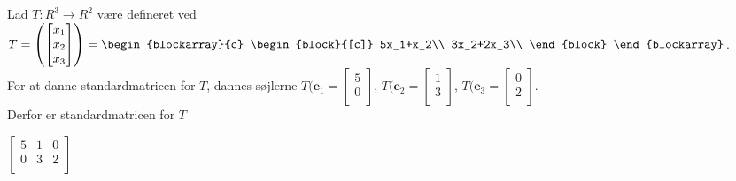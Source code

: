 \begin{eks}\label{entydigeks}
%
Lad $T: R^3 \rightarrow R^2$ være defineret ved $T=\left(
\begin{bmatrix}
x_1\\
x_2\\
x_3
\end{bmatrix}
\right)
=
\begin{blockarray}{c}
\begin{block}{[c]}
5x_1+x_2\\
3x_2+2x_3\\
\end{block}
\end{blockarray}
$. \\
For at danne standardmatricen for $T$, dannes søjlerne $T(\mathbf{e}_1=
\begin{bmatrix}
5\\
0\\
\end{bmatrix}$,
$T(\mathbf{e}_2=
\begin{bmatrix}
1\\
3\\
\end{bmatrix}$, 
$T(\mathbf{e}_3=
\begin{bmatrix}
0\\
2\\
\end{bmatrix}$. \\
Derfor er standardmatricen for $T$ \\
\begin{center}
$\begin{bmatrix}
5 & 1 & 0\\
0 & 3 & 2\\
\end{bmatrix}$
\end{center}
\end{eks}